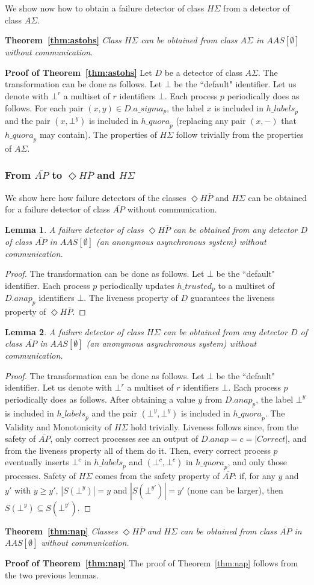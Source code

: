 \documentclass[10pt, conference, compsocconf]{IEEEtran}
\newtheorem{lemma}{Lemma}
\newcommand{\tightparagraph}[1]{\smallskip \noindent \textbf{#1} \hspace{1ex}}
\newcommand{\HS}{{H\Sigma}}
\newcommand{\AS}{{A\Sigma}}
\newcommand{\HP}{{ \Diamond H\overline{P}}}
\newcommand{\NAP}{{ \overline{\mathit{AP}}}}
\newcommand{\C}{{\mathit{Correct}}}
\newcommand{\quora}{{\mathit{h\_quora}}}
\newcommand{\labels}{{\mathit{h\_labels}}}
\begin{document}
We show now how to obtain a failure detector of class $\HS$ from a detector of class $\AS$.

\tightparagraph{Theorem~\ref{thm:astohs}}
\emph{Class $\HS$ can be obtained from class $\AS$ in $AAS[\emptyset]$ without communication.}


\tightparagraph{Proof of Theorem~\ref{thm:astohs}}
Let $D$ be a detector of class $\AS$.
The transformation can be done as follows. Let $\bot$ be the ``default" identifier. Let us denote with $\bot^r$ a multiset of $r$ identifiers $\bot$. Each process $p$ periodically does as follows. For each pair $(x,y) \in D.a\_sigma_p$, the label $x$ is included in $\labels_p$ and the pair $(x, \bot^y)$ is included in $\quora_p$ (replacing any pair $(x,-)$ that $\quora_p$ may contain). The properties of $\HS$ follow trivially from the properties of $\AS$.

   
\subsubsection{From $\NAP$ to $\HP$ and $\HS$}

We show here how failure detectors of the classes $\HP$ and $\HS$ can be obtained for a failure detector of class $\NAP$ without communication.

\begin{lemma}
A failure detector of class $\HP$ can be obtained from any detector $D$ of class $\NAP$ in $AAS[\emptyset]$ (an anonymous asynchronous system) without communication.
\end{lemma}
\begin{proof}
The transformation can be done as follows. Let $\bot$ be the ``default" identifier. Each process $p$ 
periodically updates $h\_trusted_p$ to a multiset of $D.anap_p$ identifiers $\bot$. The liveness property of $D$ guarantees the liveness property of $\HP$.
\end{proof}

\begin{lemma}
A failure detector of class $\HS$ can be obtained from any detector $D$ of class $\NAP$ in $AAS[\emptyset]$ (an anonymous asynchronous system) without communication.
\end{lemma}
\begin{proof}
The transformation can be done as follows. Let $\bot$ be the ``default" identifier. Let us denote with $\bot^r$ a multiset of $r$ identifiers $\bot$. 
Each process $p$ periodically does as follows. After obtaining a value $y$ from $D.anap_p$, the label $\bot^y$ is included in $\labels_p$ and the pair $(\bot^y, \bot^y)$ is included in $\quora_p$. The Validity and Monotonicity of $\HS$ hold trivially. Liveness follows since, from the safety of $\NAP$, only correct processes see an output of $D.anap=c=|\C|$, and from the liveness property all of them do it. Then, every correct process $p$ eventually inserts $\bot^c$ in $\labels_p$ and $(\bot^c, \bot^c)$ in $\quora_p$, and only those processes. Safety of $\HS$ comes from the safety property of $\NAP$: if, for any $y$ and $y'$ with $y \geq y'$, $|S(\bot^y)| = y$ and $|S(\bot^{y'})|=y'$ (none can be larger), then $S(\bot^y) \subseteq S(\bot^{y'})$.
\end{proof}

\tightparagraph{Theorem~\ref{thm:nap}}
\emph{Classes $\HP$ and $\HS$ can be obtained from class $\NAP$ in $AAS[\emptyset]$ without communication.}

\tightparagraph{Proof of Theorem~\ref{thm:nap}}
The proof of Theorem~\ref{thm:nap} follows from the two previous lemmas.

 
\end{document}
